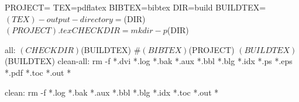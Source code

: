 PROJECT=
TEX=pdflatex
BIBTEX=bibtex
DIR=build
BUILDTEX=$(TEX) -output-directory=$(DIR) $(PROJECT).tex

CHECKDIR=mkdir -p $(DIR)

all:
	$(CHECKDIR)
	$(BUILDTEX)
	#$(BIBTEX) $(PROJECT)
	$(BUILDTEX)
	$(BUILDTEX)
clean-all:
	rm -f *.dvi *.log *.bak *.aux *.bbl *.blg *.idx *.ps *.eps *.pdf *.toc *.out *~

clean:
	rm -f *.log *.bak *.aux *.bbl *.blg *.idx *.toc *.out *~
